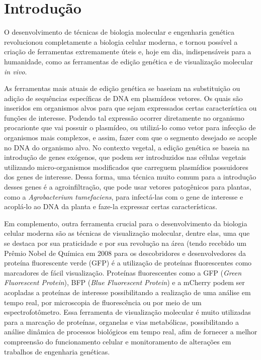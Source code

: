 \section{Introdução} 
O desenvolvimento de técnicas de biologia molecular e engenharia genética
revolucionou completamente a biologia celular moderna, e tornou possível a
criação de ferramentas extremamente úteis e, hoje em dia, indispensáveis para a
humanidade\cite{teófilo_gallão_2019}, como as ferramentas de edição genética e
de visualização molecular \textit{in vivo}.

As ferramentas mais atuais de edição genética se baseiam na substituição ou
adição de sequências específicas de DNA em plasmídeos
vetores\cite{BriefyHistoryOfGenetics}. Os quais são inseridos em organismos
alvos para que sejam expressados certas característica ou funções de interesse.
Podendo tal expressão ocorrer diretamente no organismo procarionte que vai
possuir o plasmídeo\cite{ruiz_silhavy_2022}, ou utilizá-lo como vetor para
infecção de organismos mais complexos, e assim, fazer com que o segmento
desejado se acople no DNA do organismo alvo. No contexto vegetal, a edição
genética se baseia na introdução de genes exógenos, que podem ser introduzidos
nas células vegetais utilizando micro-organismos modificados que carreguem
plasmídios possuidores dos genes de interesse\cite{embrapa2017manual}. Dessa
forma, uma técnica muito comum para a introdução desses genes é a
agroinfiltração, que pode usar vetores patogênicos para plantas, como a
\textit{Agrobacterium tumefaciens}, para infectá-las com o gene de interesse e
acoplá-lo ao DNA da planta e faze-la expressar certas
características\cite{embrapa2017manual}.

Em complemento, outra ferramenta crucial para o desenvolvimento da biologia
celular moderna são as técnicas de visualização molecular, dentre elas, uma que
se destaca por sua praticidade e por sua revolução na área (tendo recebido um
Prêmio Nobel de Química em 2008 para os descobridores e desenvolvedores da
proteína fluorescente verde (GFP)\cite{jeremy_jackson_2009} é a utilização de
proteínas fluorescentes como marcadores de fácil visualização. Proteínas
fluorescentes como a GFP (\textit{Green Fluorescent Protein}), BFP (\textit{Blue
Fluorescent Protein}) e a mCherry podem ser acopladas a proteínas de interesse
possibilitando a realização de uma análise em tempo real, por microscopia de
fluorescência ou por meio de um espectrofotômetro.  Essa ferramenta de
visualização molecular é muito utilizadas para a marcação de proteínas,
organelas e vias metabólicas, possibilitando a análise dinâmica de processos
biológicos em tempo real, afim de fornecer a melhor compreensão do funcionamento
celular e monitoramento de alterações em trabalhos de engenharia
genéticas\cite{misteli_spector_1997}. 

